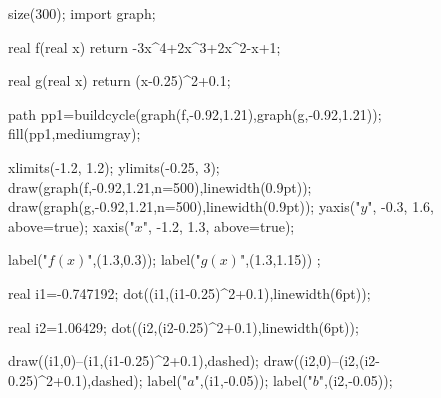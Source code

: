 	size(300);  
    import graph;

    real f(real x)
    {
    	return -3x^4+2x^3+2x^2-x+1;
    }
    
    real g(real x)
    {
    	return (x-0.25)^2+0.1;
    }
    
    path pp1=buildcycle(graph(f,-0.92,1.21),graph(g,-0.92,1.21));
    fill(pp1,mediumgray);
    
    xlimits(-1.2, 1.2);
	ylimits(-0.25, 3);
    draw(graph(f,-0.92,1.21,n=500),linewidth(0.9pt));
    draw(graph(g,-0.92,1.21,n=500),linewidth(0.9pt));
	yaxis("$y$", -0.3, 1.6, above=true);
	xaxis("$x$", -1.2, 1.3, above=true);
	
	label("$f(x)$",(1.3,0.3));
	label("$g(x)$",(1.3,1.15))	;
	
	real i1=-0.747192;
	dot((i1,(i1-0.25)^2+0.1),linewidth(6pt));
	
	real i2=1.06429;
	dot((i2,(i2-0.25)^2+0.1),linewidth(6pt));
	
	draw((i1,0)--(i1,(i1-0.25)^2+0.1),dashed);
	draw((i2,0)--(i2,(i2-0.25)^2+0.1),dashed);
	label("$a$",(i1,-0.05));
	label("$b$",(i2,-0.05));